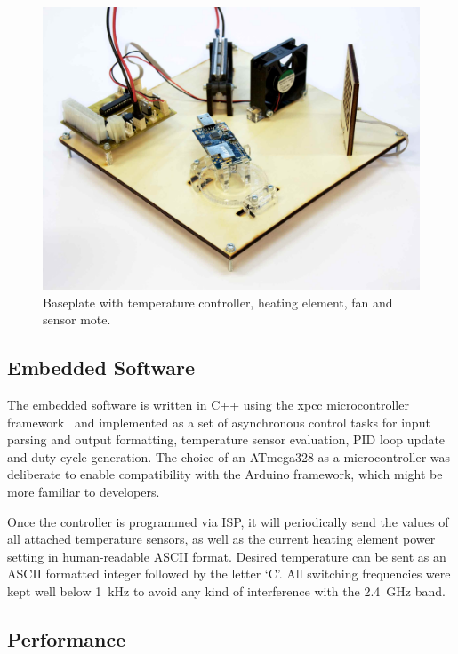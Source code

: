 \begin{figure}[t]
	\centering
    \includegraphics[width=1\columnwidth]{figures/temperature_box}
	\caption{Baseplate with temperature controller, heating element, fan and sensor mote.}
    \label{fig:box_hardware_picture}
\end{figure}


\subsection{Embedded Software}

The embedded software is written in C++ using the xpcc microcontroller framework~\cite{xpcc.io} and implemented as a set of asynchronous control tasks for input parsing and output formatting, temperature sensor evaluation, \acs{PID} loop update and duty cycle generation.
The choice of an ATmega328 as a microcontroller was deliberate to enable compatibility with the Arduino framework, which might be more familiar to developers.

Once the controller is programmed via \ac{ISP}, it will periodically send the values of all attached temperature sensors, as well as the current heating element power setting in human-readable ASCII format.
Desired temperature can be sent as an ASCII formatted integer followed by the letter `C'.
All switching frequencies were kept well below \SI{1}{\kilo\hertz} to avoid any kind of interference with the \SI{2.4}{\giga\hertz} band.


\subsection{Performance}

